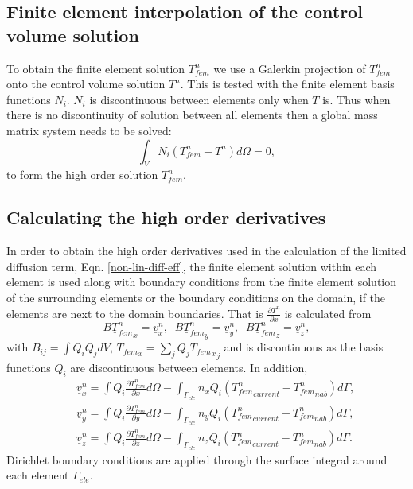 \subsection{Finite element interpolation of the control volume solution} 
To obtain the finite element solution $T_{fem}^n$ we use a Galerkin projection of $T_{fem}^n$ onto the control volume solution $T^n$. This is tested with the finite element basis functions $N_i$. $N_i$ is discontinuous between elements only when $T$ is. Thus when there is no discontinuity of solution between all elements then a global mass matrix system needs to be solved:
 \begin{displaymath}
 \int_V N_i (T_{fem}^n- T^n) d\Omega =0, 
\end{displaymath}
to form the high order solution $T_{fem}^n$.  


\subsection{Calculating the high order derivatives}

In order to obtain the high order derivatives used in the calculation of the limited diffusion term, Eqn. \ref{non-lin-diff-eff}, the finite element solution within each element is used along with boundary conditions from the finite element solution of the surrounding elements or the boundary conditions on the domain, if the elements are next to the domain boundaries. 
That is $\frac{\partial T^n}{\partial x}$ is calculated from
 \begin{equation}
 B {\underline T_{fem}^n}_x = \underline v_x^n, \;\;
 B {\underline T_{fem}^n}_y = \underline v_y^n, \;\;
 B {\underline T_{fem}^n}_z = \underline v_z^n, 
\label{form-derivs}
\end{equation}
with $B_{ij}=\int Q_i Q_j dV$, ${T_{fem}}_x=\sum_j Q_j {{T_{fem}}_x}_j$ and is discontinuous as the basis functions $Q_i$ are discontinuous between elements. In addition,
 \begin{eqnarray}
&& \underline v_x^n=\int Q_{i} \frac{\partial T_{fem}^n}{\partial x} d\Omega 
-\int_{\Gamma_{ele}} n_x Q_i ({T_{fem}^n}_{current}-{T_{fem}^n}_{nab})d\Gamma, \nonumber \\
&& \underline v_y^n=\int Q_{i} \frac{\partial T_{fem}^n}{\partial y} d\Omega 
-\int_{\Gamma_{ele}} n_y Q_i ({T_{fem}^n}_{current}-{T_{fem}^n}_{nab})d\Gamma, \nonumber \\
&& \underline v_z^n=\int Q_{i} \frac{\partial T_{fem}^n}{\partial z} d\Omega 
-\int_{\Gamma_{ele}} n_z Q_i ({T_{fem}^n}_{current}-{T_{fem}^n}_{nab})d\Gamma. 
\end{eqnarray}
Dirichlet boundary conditions are applied through the surface integral around each element ${\Gamma_{ele}}$.  

